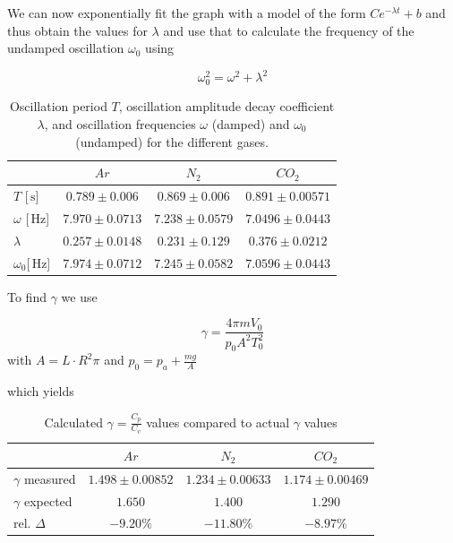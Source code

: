 \documentclass{scrreprt}
\newcommand{\unit}[1]{\ensuremath{\, \mathrm{#1}}}
\begin{document}
We can now exponentially fit the graph with a model of the form $C e^{-\lambda t} + b$ and thus obtain the values for $\lambda$ and use that to calculate the frequency of the undamped oscillation $\omega_0$ using

\begin{equation}
\omega_0^2=\omega^2+\lambda^2
\end{equation}

\begin{table}[H]
\center
\begin{tabular}{|l|ccc|}
\hline
	&	$Ar$ & $N_2$		&	$CO_2$\\ \hline\hline
$T$ [$\unit{s}$] & $0.789 \pm 0.006$ & $0.869 \pm 0.006$  & $0.891 \pm 0.00571$\\\hline\hline
$\omega$ [$\unit{Hz}$] & $7.970 \pm 0.0713$ & $7.238 \pm 0.0579$ & $7.0496 \pm 0.0443$\\\hline
$\lambda$ & $0.257 \pm 0.0148$ & $0.231 \pm 0.129$ & $0.376 \pm 0.0212$\\ \hline
$\omega_0$[$\unit{Hz}$] & $7.974 \pm 0.0712$ & $7.245 \pm 0.0582$ & $7.0596 \pm 0.0443$ \\ \hline

\end{tabular}
\caption{Oscillation period $T$, oscillation amplitude decay coefficient $\lambda$, and oscillation frequencies $\omega$ (damped) and $\omega_0$ (undamped) for the different gases.}
\end{table}

To find $\gamma$ we use 

\begin{equation}
\gamma = \frac{4 \pi m V_0}{p_0 A^2 T_0^2}
\end{equation}
with $A = L \cdot R^2\pi$ and $p_0 = p_a + \frac{m g}{A}$

which yields

\begin{table}[H]
\center
\begin{tabular}{|l|ccc|}
\hline
	&	$Ar$ & $N_2$		&	$CO_2$\\ \hline\hline
$\gamma$ measured & $1.498 \pm 0.00852$ & $1.234 \pm 0.00633$  & $1.174 \pm 0.00469$\\\hline
$\gamma$ expected & $1.650$ & $1.400$ & $1.290$\\ \hline
rel. $\Delta$ & $-9.20\%$ & $-11.80\%$ & $-8.97\%$\\ \hline

\end{tabular}
\caption{Calculated $\gamma = \frac{C_p}{C_v}$ values compared to actual $\gamma$ values }
\end{table}
\end{document}
